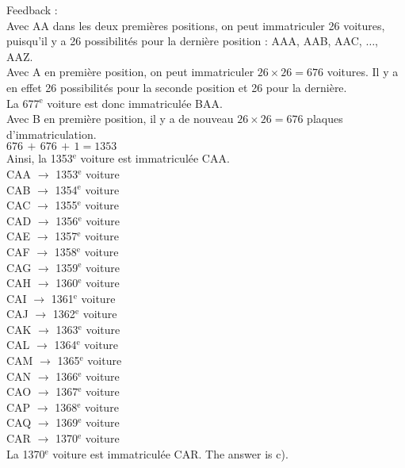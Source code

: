 \documentclass[letterpaper, 12pt]{article}
\begin{document}
Feedback : \\
Avec AA dans les deux premi\`eres positions, on peut immatriculer 26
voitures, puisqu'il y a 26 possibilit\'es pour la derni\`ere position : AAA,
AAB, AAC, $\ldots$, AAZ.\\
Avec A en premi\`ere position, on peut immatriculer $26\times26=676$
voitures. Il y a en effet 26 possibilit\'es pour la seconde position et 26
pour la derni\`ere.  \\
La 677$^{\textrm{e}}$ voiture est donc immatricul\'ee BAA.\\
Avec B en premi\`ere position, il y a de nouveau $26\times26=676$ plaques
d'immatriculation.\\
$676\,+\,676\,+\,1=1353$\\
Ainsi, la 1353$^{\textrm{e}}$ voiture est immatricul\'ee CAA.\\
CAA $\longrightarrow$ 1353$^{\textrm{e}}$ voiture\\
CAB $\longrightarrow$ 1354$^{\textrm{e}}$ voiture\\
CAC $\longrightarrow$ 1355$^{\textrm{e}}$ voiture\\
CAD $\longrightarrow$ 1356$^{\textrm{e}}$ voiture\\
CAE $\longrightarrow$ 1357$^{\textrm{e}}$ voiture\\
CAF $\longrightarrow$ 1358$^{\textrm{e}}$ voiture\\
CAG $\longrightarrow$ 1359$^{\textrm{e}}$ voiture\\
CAH $\longrightarrow$ 1360$^{\textrm{e}}$ voiture \\
CAI $\longrightarrow$ 1361$^{\textrm{e}}$ voiture\\
CAJ $\longrightarrow$ 1362$^{\textrm{e}}$ voiture\\
CAK $\longrightarrow$ 1363$^{\textrm{e}}$ voiture\\
CAL $\longrightarrow$ 1364$^{\textrm{e}}$ voiture\\
CAM $\longrightarrow$ 1365$^{\textrm{e}}$ voiture\\
CAN $\longrightarrow$ 1366$^{\textrm{e}}$ voiture\\
CAO $\longrightarrow$ 1367$^{\textrm{e}}$ voiture\\
CAP $\longrightarrow$ 1368$^{\textrm{e}}$ voiture\\
CAQ $\longrightarrow$ 1369$^{\textrm{e}}$ voiture\\
CAR $\longrightarrow$ 1370$^{\textrm{e}}$ voiture\\
La 1370$^{\textrm{e}}$ voiture est immatricul\'ee CAR. The answer is
c).\\
\end{document}
